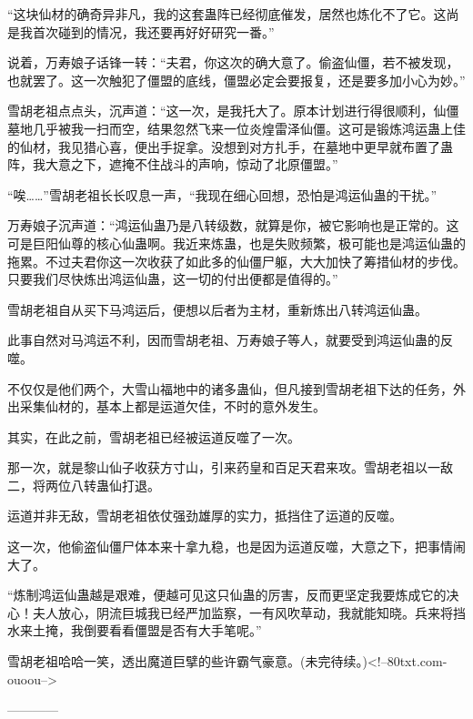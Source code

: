 \begin{this_body}
“这块仙材的确奇异非凡，我的这套蛊阵已经彻底催发，居然也炼化不了它。这尚是我首次碰到的情况，我还要再好好研究一番。”

说着，万寿娘子话锋一转：“夫君，你这次的确大意了。偷盗仙僵，若不被发现，也就罢了。这一次触犯了僵盟的底线，僵盟必定会要报复，还是要多加小心为妙。”

雪胡老祖点点头，沉声道：“这一次，是我托大了。原本计划进行得很顺利，仙僵墓地几乎被我一扫而空，结果忽然飞来一位炎煌雷泽仙僵。这可是锻炼鸿运蛊上佳的仙材，我见猎心喜，便出手捉拿。没想到对方扎手，在墓地中更早就布置了蛊阵，我大意之下，遮掩不住战斗的声响，惊动了北原僵盟。”

“唉……”雪胡老祖长长叹息一声，“我现在细心回想，恐怕是鸿运仙蛊的干扰。”

万寿娘子沉声道：“鸿运仙蛊乃是八转级数，就算是你，被它影响也是正常的。这可是巨阳仙尊的核心仙蛊啊。我近来炼蛊，也是失败频繁，极可能也是鸿运仙蛊的拖累。不过夫君你这一次收获了如此多的仙僵尸躯，大大加快了筹措仙材的步伐。只要我们尽快炼出鸿运仙蛊，这一切的付出便都是值得的。”

雪胡老祖自从买下马鸿运后，便想以后者为主材，重新炼出八转鸿运仙蛊。

此事自然对马鸿运不利，因而雪胡老祖、万寿娘子等人，就要受到鸿运仙蛊的反噬。

不仅仅是他们两个，大雪山福地中的诸多蛊仙，但凡接到雪胡老祖下达的任务，外出采集仙材的，基本上都是运道欠佳，不时的意外发生。

其实，在此之前，雪胡老祖已经被运道反噬了一次。

那一次，就是黎山仙子收获方寸山，引来药皇和百足天君来攻。雪胡老祖以一敌二，将两位八转蛊仙打退。

运道并非无敌，雪胡老祖依仗强劲雄厚的实力，抵挡住了运道的反噬。

这一次，他偷盗仙僵尸体本来十拿九稳，也是因为运道反噬，大意之下，把事情闹大了。

“炼制鸿运仙蛊越是艰难，便越可见这只仙蛊的厉害，反而更坚定我要炼成它的决心！夫人放心，阴流巨城我已经严加监察，一有风吹草动，我就能知晓。兵来将挡水来土掩，我倒要看看僵盟是否有大手笔呢。”

雪胡老祖哈哈一笑，透出魔道巨擘的些许霸气豪意。(未完待续。)<!--80txt.com-ouoou-->

------------

\end{this_body}

